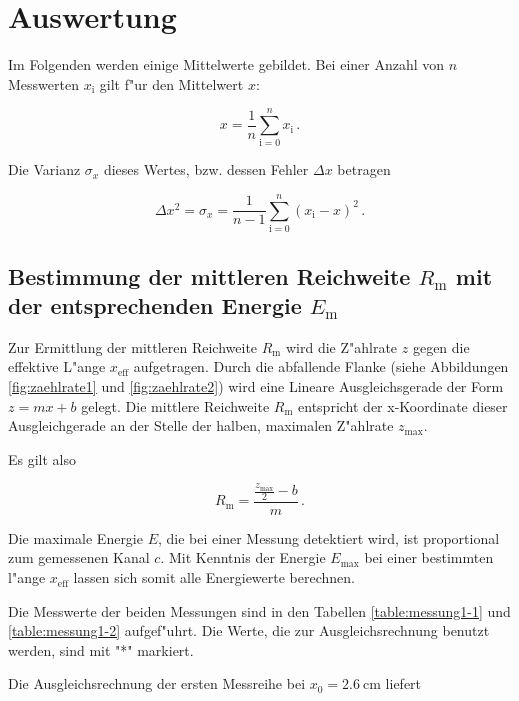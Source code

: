 \section{Auswertung}
\label{sec:auswertung}
	Im Folgenden werden einige Mittelwerte gebildet.
	Bei einer Anzahl von $n$ Messwerten $x_\mathrm{i}$ gilt f"ur den Mittelwert $x$:

	\begin{equation*}
		x = \frac{1}{n} \sum_{\mathrm{i} = 0}^n {x_\mathrm{i}} \,.
	\end{equation*}

	Die Varianz $\sigma_x$ dieses Wertes, bzw. dessen Fehler $\Delta x$ betragen

	\begin{equation*}
		\Delta x^2 = \sigma_x = \frac{1}{n - 1} \sum_{\mathrm{i} = 0}^n{\left(x_\mathrm{i} - x\right)^2} \,.
	\end{equation*}

	\subsection{Bestimmung der mittleren Reichweite $R_\mathrm{m}$ mit der entsprechenden Energie $E_\mathrm{m}$}
	\label{subsec:mittlere_reichweite}
		Zur Ermittlung der mittleren Reichweite $R_\mathrm{m}$ wird die Z"ahlrate $z$ gegen die effektive L"ange $x_\mathrm{eff}$ aufgetragen.
		Durch die abfallende Flanke (siehe Abbildungen \ref{fig:zaehlrate1} und \ref{fig:zaehlrate2}) wird eine Lineare Ausgleichsgerade der Form $z = mx + b$ gelegt.
		Die mittlere Reichweite $R_\mathrm{m}$ entspricht der x-Koordinate dieser Ausgleichgerade an der Stelle der halben, maximalen Z"ahlrate $z_\mathrm{max}$.

		Es gilt also

		\begin{equation*}
			R_\mathrm{m} = \frac{\frac{z_\mathrm{max}}{2} - b}{m} \,.
		\end{equation*}

		Die maximale Energie $E$, die bei einer Messung detektiert wird, ist proportional zum gemessenen Kanal $c$.
		Mit Kenntnis der Energie $E_\mathrm{max}$ bei einer bestimmten l"ange $x_\mathrm{eff}$ lassen sich somit alle Energiewerte berechnen.

		Die Messwerte der beiden Messungen sind in den Tabellen \ref{table:messung1-1} und \ref{table:messung1-2} aufgef"uhrt.
		Die Werte, die zur Ausgleichsrechnung benutzt werden, sind mit "*" markiert.

		\clearpage
		Die Ausgleichsrechnung der ersten Messreihe bei $x_0 = \SI{2.6}{\centi \meter}$ liefert

